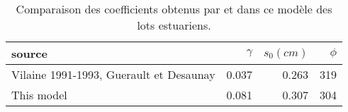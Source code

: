 \begin{table}[htbp]
\centering
\caption{Comparaison des coefficients obtenus par \citet{desaunay_seasonal_1997} et dans ce modèle des lots estuariens.} 
\label{resumé_cyclique}
\begin{tabularx}{0.6\textwidth}{lrrr}
  \hline
source & $\gamma$ & $s_0(cm)$ & $\phi$ \\ 
  \hline
Vilaine 1991-1993, Guerault et Desaunay & 0.037 & 0.263 & 319 \\ 
  This model & 0.081 & 0.307 & 304 \\ 
   \hline
\end{tabularx}
\end{table}
